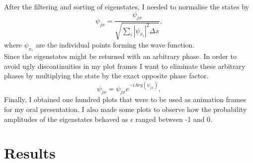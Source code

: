 \documentclass[10pt, a4paper, singlespacing, headsepline]{report}
\begin{document}
After the filtering and sorting of eigenstates, I needed to normalise the states by 
\begin{equation}
\psi_{jx} = \frac{\psi_{jx}}{\sqrt{\sum_{i} |\psi_{x_{i}}|^2 \Delta x}},
\end{equation}
where $\psi_{x_{i}}$ are the individual points forming the wave function.\\
Since the eigenstates might be returned with an arbitrary phase. In order to avoid ugly discontinuities in my plot frames I want to eliminate these arbitrary phases by multiplying the state by the exact opposite phase factor.
\begin{equation}
\psi_{jx} = \psi_{jx} e^{-iArg(\psi_{jx})},
\end{equation}
Finally, I obtained one hundred plots that were to be used as animation frames for my oral presentation. I also made some plots to observe how  the probability amplitudes of the eigenstates behaved as $\epsilon$ ranged between -1 and 0.


\section{Results}
\end{document}
